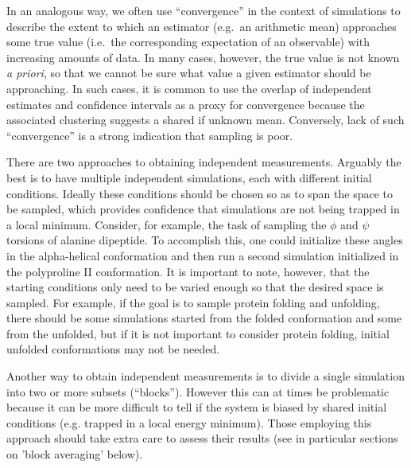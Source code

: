 In an analogous way, we often use ``convergence'' in the context of simulations to describe the extent to which an estimator (e.g.\ an arithmetic mean) approaches some true value (i.e.\ the corresponding expectation of an observable) with increasing amounts of data.  In many cases, however, the true value is not known {\it a priori}, so that we cannot be sure what value a given estimator should be approaching.  In such cases, it is common to use the overlap of independent estimates and confidence intervals as a proxy for convergence because the associated clustering suggests a shared if unknown mean.  Conversely, lack of such ``convergence'' is a strong indication that sampling is poor.

 
There are two approaches to obtaining independent measurements. Arguably the best is to have multiple independent simulations, each with different initial conditions. Ideally these conditions should be chosen so as to span the space to be sampled, which provides confidence that simulations are not being trapped in a local minimum. Consider, for example, the task of sampling the $\phi$ and $\psi$ torsions of alanine dipeptide.  To accomplish this, one could initialize these angles in the alpha-helical conformation and then run a second simulation initialized in the polyproline II conformation. It is important to note, however, that the starting conditions only need to be varied enough so that the desired space is sampled. For example, if the goal is to sample protein folding and unfolding, there should be some simulations started from the folded conformation and some from the unfolded, but if it is not important to consider protein folding, initial unfolded conformations may not be needed.
 
Another way to obtain independent measurements is to divide a single simulation into two or more subsets (``blocks''). However this can at times be problematic because it can be more difficult to tell if the system is biased by shared initial conditions (e.g. trapped in a local energy minimum). Those employing this approach should take extra care to assess their results (see in particular sections on 'block averaging' below).

